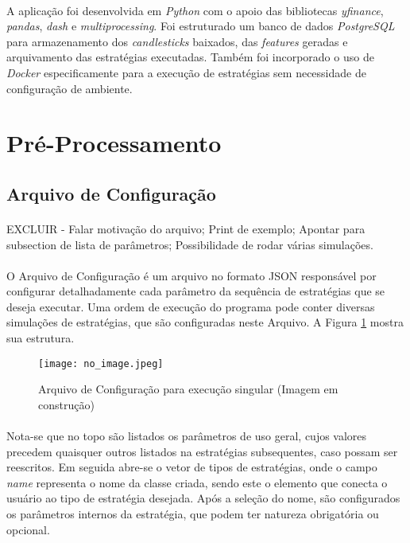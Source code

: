\paragraph{} A aplicação foi desenvolvida em \textit{Python} com o apoio das bibliotecas \textit{yfinance}, \textit{pandas}, \textit{dash} e \textit{multiprocessing}. Foi estruturado um banco de dados \textit{PostgreSQL} para armazenamento dos \textit{candlesticks} baixados, das \textit{features} geradas e arquivamento das estratégias executadas. Também foi incorporado o uso de \textit{Docker} especificamente para a execução de estratégias sem necessidade de configuração de ambiente.

\section{Pré-Processamento}

\subsection{Arquivo de Configuração}
\paragraph{} EXCLUIR - Falar motivação do arquivo; Print de exemplo; Apontar para subsection de lista de parâmetros; Possibilidade de rodar várias simulações.

\paragraph{} O Arquivo de Configuração é um arquivo no formato JSON responsável por configurar detalhadamente cada parâmetro da sequência de estratégias que se deseja executar. Uma ordem de execução do programa pode conter diversas simulações de estratégias, que são configuradas neste Arquivo. A Figura \ref{fig:101} mostra sua estrutura.

\begin{figure}[h]
    \texttt{[image: no\_image.jpeg]}
    \centering
    \caption{Arquivo de Configuração para execução singular (Imagem em construção)}
    \label{fig:101}
\end{figure}

\paragraph{} Nota-se que no topo são listados os parâmetros de uso geral, cujos valores precedem quaisquer outros listados na estratégias subsequentes, caso possam ser reescritos. Em seguida abre-se o vetor de tipos de estratégias, onde o campo \textit{name} representa o nome da classe criada, sendo este o elemento que conecta o usuário ao tipo de estratégia desejada. Após a seleção do nome, são configurados os parâmetros internos da estratégia, que podem ter natureza obrigatória ou opcional.

